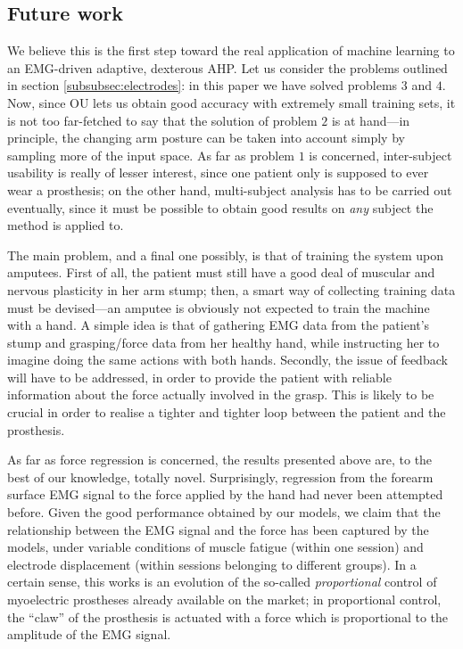 \subsection*{Future work}

We believe this is the first step toward the real application of
machine learning to an EMG-driven adaptive, dexterous AHP. Let us
consider the problems outlined in section
\ref{subsubsec:electrodes}: in this paper we have solved problems
$3$ and $4$. Now, since OU lets us obtain good accuracy with extremely
small training sets, it is not too far-fetched to say that the
solution of problem $2$ is at hand---in principle, the changing arm
posture can be taken into account simply by sampling more of the input
space. As far as problem $1$ is concerned, inter-subject usability is
really of lesser interest, since one patient only is supposed to ever
wear a prosthesis; on the other hand, multi-subject analysis has to be
carried out eventually, since it must be possible to obtain good
results on \emph{any} subject the method is applied to.

The main problem, and a final one possibly, is that of training the
system upon amputees. First of all, the patient must still have a good
deal of muscular and nervous plasticity in her arm stump; then, a
smart way of collecting training data must be devised---an amputee is
obviously not expected to train the machine with a hand. A simple idea
is that of gathering EMG data from the patient's stump and
grasping/force data from her healthy hand, while instructing her to
imagine doing the same actions with both hands. Secondly, the issue of
feedback will have to be addressed, in order to provide the patient
with reliable information about the force actually involved in the
grasp. This is likely to be crucial in order to realise a tighter and
tighter loop between the patient and the prosthesis.

As far as force regression is concerned, the results presented above
are, to the best of our knowledge, totally novel. Surprisingly,
regression from the forearm surface EMG signal to the force applied by
the hand had never been attempted before. Given the good performance
obtained by our models, we claim that the relationship between the EMG
signal and the force has been captured by the models, under variable
conditions of muscle fatigue (within one session) and electrode
displacement (within sessions belonging to different groups). In a
certain sense, this works is an evolution of the so-called
\emph{proportional} control of myoelectric prostheses already
available on the market; in proportional control, the ``claw'' of the
prosthesis is actuated with a force which is proportional to the
amplitude of the EMG signal.
